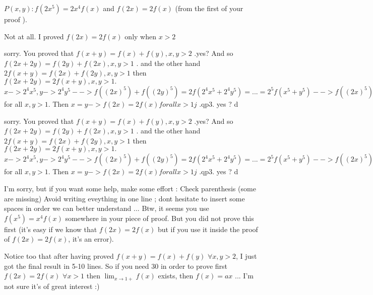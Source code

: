 \begin{solution}
	\begin{tcolorbox}$P(x,y):f(2x^5)=2x^4f(x)$ and $f(2x)=2f(x) $ (from the first of your proof ). \end{tcolorbox}
Not at all. I proved $f(2x)=2f(x)$ only when $x>2$
\end{solution}



\begin{solution}
	sorry. You proved that $f(x+y)=f(x)+f(y),x,y>2$ .yes? And so $f(2x+2y)=f(2y)+f(2x),x,y>1$ . and the other hand $2f(x+y)=f(2x)+f(2y),x,y>1$ then $f(2x+2y)=2f(x+y),x,y>1.  $ $x->2^4x^5,y->2^4y^5  --> f((2x)^5)+f((2y)^5)=2f(2^4x^5+2^4y^5)=...=2^5f(x^5+y^5) -->f((2x)^5)+f((2y)^5=2^5f(x^5+y^5) -> (2x)^4f(2x)+(2y)^4f(2y)=2^5(x^4f(x)=y^4f(y)) $ for all $x,y>1$. Then $x=y -> f(2x)=2f(x) for all x>1 j$ .qp3.  yes ? d
\end{solution}



\begin{solution}
	\begin{tcolorbox}sorry. You proved that $f(x+y)=f(x)+f(y),x,y>2$ .yes? And so $f(2x+2y)=f(2y)+f(2x),x,y>1$ . and the other hand $2f(x+y)=f(2x)+f(2y),x,y>1$ then $f(2x+2y)=2f(x+y),x,y>1.  $ $x->2^4x^5,y->2^4y^5  --> f((2x)^5)+f((2y)^5)=2f(2^4x^5+2^4y^5)=...=2^5f(x^5+y^5) -->f((2x)^5)+f((2y)^5=2^5f(x^5+y^5) -> (2x)^4f(2x)+(2y)^4f(2y)=2^5(x^4f(x)=y^4f(y)) $ for all $x,y>1$. Then $x=y -> f(2x)=2f(x) for all x>1 j$ .qp3.  yes ? d\end{tcolorbox}
I'm sorry, but if you want some help, make some effort :
Check parenthesis (some are missing)
Avoid writing eveything in one line ; dont hesitate to insert some spaces in order we can better understand 
...
Btw, it seems you use $f(x^5)=x^4f(x)$ somewhere in your piece of proof. But you did not prove this first (it's easy if we know that $f(2x)=2f(x)$ but if you use it inside the proof of $f(2x)=2f(x)$, it's an error).

Notice too that after having proved $f(x+y)=f(x)+f(y)$ $\forall x,y>2$, I just got the final result in 5-10 lines. So if you need $30$ in order to prove first $f(2x)=2f(x)$ $\forall x>1$ then $\lim_{x\to 1+}f(x)$ exists, then $f(x)=ax$ ... I'm not sure it's of great interest :)
\end{solution}



